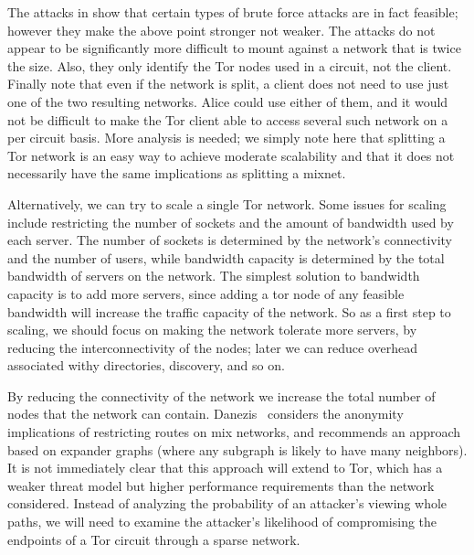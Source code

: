 \documentclass{llncs}
\begin{document}
The attacks in \cite{attack-tor-oak05} show that certain types of
brute force attacks are in fact feasible; however they make the
above point stronger not weaker. The attacks do not appear to be
significantly more difficult to mount against a network that is
twice the size. Also, they only identify the Tor nodes used in a
circuit, not the client. Finally note that even if the network is split,
a client does not need to use just one of the two resulting networks.
Alice could use either of them, and it would not be difficult to make
the Tor client able to access several such network on a per circuit
basis. More analysis is needed; we simply note here that splitting
a Tor network is an easy way to achieve moderate scalability and that
it does not necessarily have the same implications as splitting a mixnet.

Alternatively, we can try to scale a single Tor network.  Some issues for
scaling include restricting the number of sockets and the amount of bandwidth
used by each server.  The number of sockets is determined by the network's
connectivity and the number of users, while bandwidth capacity is determined
by the total bandwidth of servers on the network.  The simplest solution to
bandwidth capacity is to add more servers, since adding a tor node of any
feasible bandwidth will increase the traffic capacity of the network.  So as
a first step to scaling, we should focus on making the network tolerate more
servers, by reducing the interconnectivity of the nodes; later we can reduce
overhead associated withy directories, discovery, and so on.

By reducing the connectivity of the network we increase the total number of
nodes that the network can contain. Danezis~\cite{danezis-pets03} considers
the anonymity implications of restricting routes on mix networks, and
recommends an approach based on expander graphs (where any subgraph is likely
to have many neighbors).  It is not immediately clear that this approach will
extend to Tor, which has a weaker threat model but higher performance
requirements than the network considered.  Instead of analyzing the
probability of an attacker's viewing whole paths, we will need to examine the
attacker's likelihood of compromising the endpoints of a Tor circuit through
a sparse network.

\end{document}
